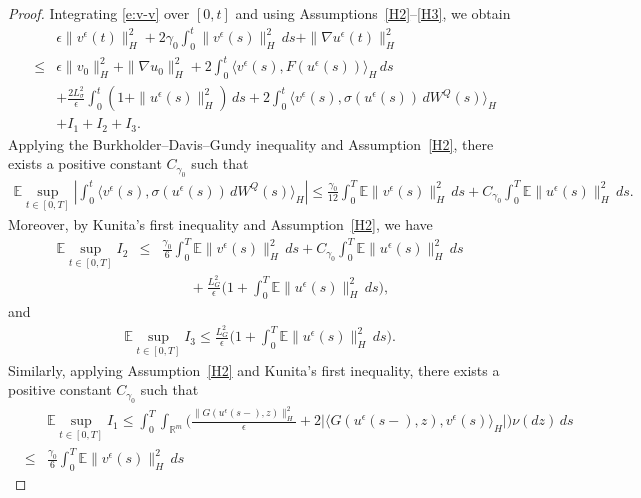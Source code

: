\documentclass[11pt]{article}
\theoremstyle{plain}
\numberwithin{equation}{section}
\begin{document}
\begin{proof}
Integrating \eqref{e:v-v} over $[0,t]$ and using Assumptions~\ref{H2}--\ref{H3},
we obtain
\begin{eqnarray}\label{ito-es-1}
&& \epsilon\|v^{\epsilon}(t)\|_{H}^2
+ 2\gamma_0\int_0^t \|v^{\epsilon}(s)\|_{H}^2\,ds
+ \|\nabla u^{\epsilon}(t)\|_{H}^2 \nonumber\\
&\le&
\epsilon\|v_0\|_{H}^2 + \|\nabla u_0\|_{H}^2
+ 2\int_0^t \langle v^{\epsilon}(s),F(u^{\epsilon}(s))\rangle_H\,ds \nonumber\\
&& + \frac{2L_\sigma^2}{\epsilon}\int_0^t (1+\|u^{\epsilon}(s)\|_{H}^2)\,ds
+ 2\int_0^t \langle v^{\epsilon}(s),\sigma(u^{\epsilon}(s))\,dW^Q(s)\rangle_H \nonumber\\
&& + I_1 + I_2 + I_3 .
\end{eqnarray}
Applying the Burkholder--Davis--Gundy inequality and Assumption~\ref{H2},
there exists a positive constant $C_{\gamma_0}$ such that
\begin{eqnarray}\label{ito-l-1}
\mathbb{E}\sup_{t\in [0,T]}
\left|\int_0^t \langle v^\epsilon(s),\sigma(u^\epsilon(s))\,dW^Q(s)\rangle_H\right|
\leq
\frac{\gamma_0}{12}\int_0^T \mathbb{E}\|v^\epsilon(s)\|_H^2\,ds
+ C_{\gamma_0}\int_0^T \mathbb{E}\|u^\epsilon(s)\|_H^2\,ds .
\end{eqnarray}
Moreover, by Kunita's first inequality
\cite[Theorem~4.4.23]{Applebaum} and Assumption~\ref{H2}, we have
\begin{eqnarray}\label{ito-l-2}
\mathbb{E}\sup_{t\in [0,T]} I_2
&\leq&
\frac{\gamma_0}{6}\int_0^T \mathbb{E}\|v^\epsilon(s)\|_H^2\,ds
+ C_{\gamma_0}\int_0^T \mathbb{E}\|u^\epsilon(s)\|_H^2\,ds
\nonumber\\
&&\qquad
+ \frac{L_G^2}{\epsilon}
\Big(1+\int_0^T \mathbb{E}\|u^\epsilon(s)\|_H^2\,ds\Big),
\end{eqnarray}
and
\begin{eqnarray}\label{ito-l-3}
\mathbb{E}\sup_{t\in [0,T]} I_3
\le
\frac{L_G^2}{\epsilon}
\Big(1+\int_0^T \mathbb{E}\|u^\epsilon(s)\|_H^2\,ds\Big).
\end{eqnarray}
Similarly, applying Assumption~\ref{H2} and Kunita's first inequality,
there exists a positive constant $C_{\gamma_0}$ such that
\begin{eqnarray}\label{ito-l-4}
&&\mathbb{E}\sup_{t\in [0,T]} I_1
\le
\int_0^T\int_{\mathbb{R}^m}
\Big(
\frac{\|G(u^\epsilon(s-),z)\|_H^2}{\epsilon}
+ 2\big|\langle G(u^\epsilon(s-),z),v^\epsilon(s)\rangle_H\big|
\Big)\nu(dz)\,ds
\nonumber\\
&\leq&
\frac{\gamma_0}{6}\int_0^T \mathbb{E}\|v^\epsilon(s)\|_H^2\,ds

\end{eqnarray}
\end{proof}
\end{document}
